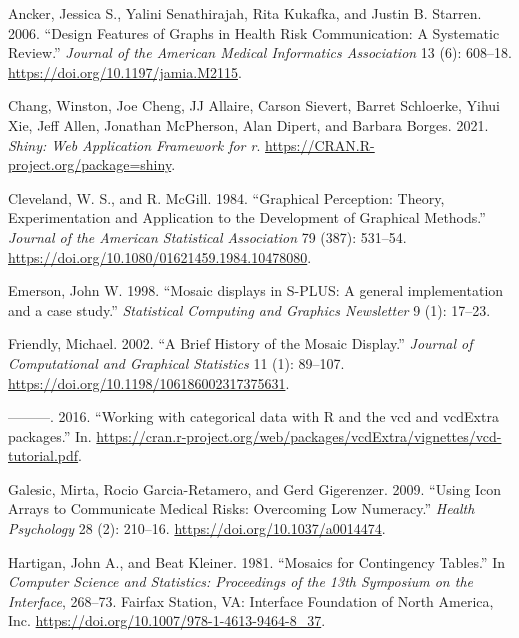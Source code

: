 \hypertarget{refs}{}
\begin{CSLReferences}{1}{0}
\leavevmode{}%
Ancker, Jessica S., Yalini Senathirajah, Rita Kukafka, and Justin B. Starren. 2006. {``Design Features of Graphs in Health Risk Communication: A Systematic Review.''} \emph{Journal of the American Medical Informatics Association} 13 (6): 608--18. \url{https://doi.org/10.1197/jamia.M2115}.

\leavevmode{}%
Chang, Winston, Joe Cheng, JJ Allaire, Carson Sievert, Barret Schloerke, Yihui Xie, Jeff Allen, Jonathan McPherson, Alan Dipert, and Barbara Borges. 2021. \emph{Shiny: Web Application Framework for r}. \url{https://CRAN.R-project.org/package=shiny}.

\leavevmode{}%
Cleveland, W. S., and R. McGill. 1984. {``Graphical Perception: Theory, Experimentation and Application to the Development of Graphical Methods.''} \emph{Journal of the American Statistical Association} 79 (387): 531--54. \url{https://doi.org/10.1080/01621459.1984.10478080}.

\leavevmode{}%
Emerson, John W. 1998. {``{Mosaic displays in S-PLUS: A general implementation and a case study}.''} \emph{Statistical Computing and Graphics Newsletter} 9 (1): 17--23.

\leavevmode{}%
Friendly, Michael. 2002. {``A Brief History of the Mosaic Display.''} \emph{Journal of Computational and Graphical Statistics} 11 (1): 89--107. \url{https://doi.org/10.1198/106186002317375631}.

\leavevmode{}%
---------. 2016. {``{Working with categorical data with R and the vcd and vcdExtra packages}.''} In. \url{https://cran.r-project.org/web/packages/vcdExtra/vignettes/vcd-tutorial.pdf}.

\leavevmode{}%
Galesic, Mirta, Rocio Garcia-Retamero, and Gerd Gigerenzer. 2009. {``Using Icon Arrays to Communicate Medical Risks: Overcoming Low Numeracy.''} \emph{Health Psychology} 28 (2): 210--16. \url{https://doi.org/10.1037/a0014474}.

\leavevmode{}%
Hartigan, John A., and Beat Kleiner. 1981. {``Mosaics for Contingency Tables.''} In \emph{Computer Science and Statistics: Proceedings of the 13th Symposium on the Interface}, 268--73. Fairfax Station, VA: Interface Foundation of North America, Inc. \url{https://doi.org/10.1007/978-1-4613-9464-8_37}.


\end{CSLReferences}
